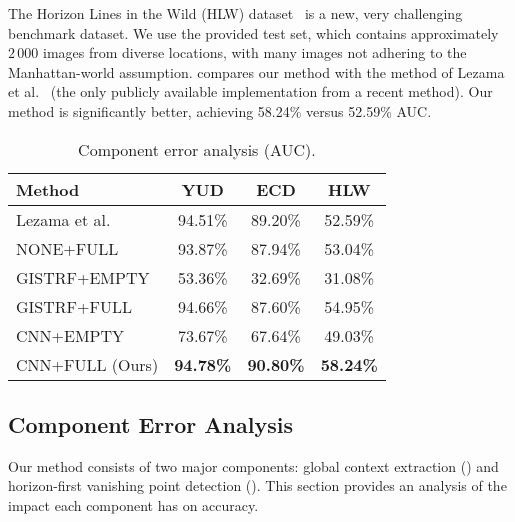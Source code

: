 
The Horizon Lines in the Wild (HLW)
dataset~\cite{authors2016deephorizon} is a new, very challenging
benchmark dataset. We use the provided test set, which contains
approximately $2\,000$ images from diverse locations, with many images
not adhering to the Manhattan-world assumption. 
compares our method with the method of Lezama et
al.~\cite{alignment2014} (the only publicly available implementation
from a recent method). Our method is significantly better, achieving
58.24\% versus 52.59\% AUC.

\begin{table}[t] \centering
  \caption{Component error analysis (AUC).}
  \vspace{-.5em}
  \begin{tabular}{|l|c|c|c|}
    \hline
    Method & YUD & ECD & HLW \\
    \hline
    \hline
    Lezama et al.~\cite{alignment2014} & 94.51\% & 89.20\% & 52.59\% \\
    \hline
    NONE+FULL & 93.87\% & 87.94\% & 53.04\% \\
    \hline
    GISTRF+EMPTY & 53.36\% &  32.69\% & 31.08\% \\
    GISTRF+FULL & 94.66\% &  87.60\% & 54.95\% \\
    \hline
    CNN+EMPTY & 73.67\% &  67.64\% & 49.03\% \\
    CNN+FULL (Ours) & \textbf{94.78\%} & \textbf{90.80\%} & \textbf{58.24\%} \\
    \hline
  \end{tabular}
  \label{tbl:contribution}
\end{table}

\subsection{Component Error Analysis}
\label{sec:analysis}

Our method consists of two major components: global context extraction
() and horizon-first vanishing point detection
(). This section provides an analysis of the impact
each component has on accuracy. 

